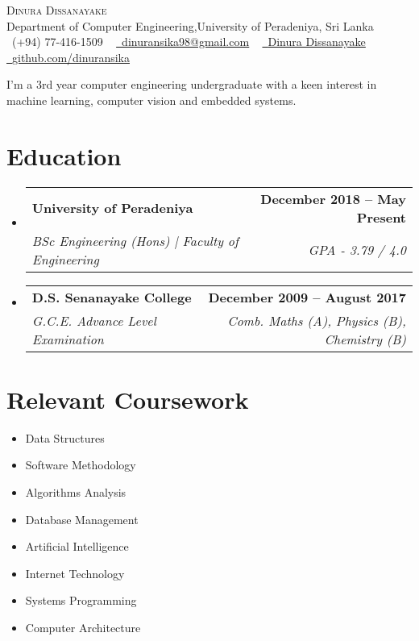 \documentclass[letterpaper,11pt]{article}
\makeatletter
\newcommand{\resumeSubheading}[4]{
  \vspace{-2pt}\item
    \begin{tabular*}{1.0\textwidth}[t]{l@{\extracolsep{\fill}}r}
      \textbf{#1} & \textbf{\small #2} \\
      \textit{\small#3} & \textit{\small #4} \\
    \end{tabular*}\vspace{-7pt}
}
\newcommand{\resumeSubSubheading}[2]{
    \item
    \begin{tabular*}{1\textwidth}{l@{\extracolsep{\fill}}r}
      \textit{\small#1} & \textit{\small #2} \\
    \end{tabular*}\vspace{-7pt}
}
\newcommand{\resumeSubHeadingListStart}{\begin{itemize}[leftmargin=0.0in, label={}]}
\newcommand{\resumeSubHeadingListEnd}{\end{itemize}}
\makeatother
\begin{document}
\begin{center}
    {\Huge \scshape Dinura Dissanayake} \\ \vspace{1pt}
    Department of Computer Engineering,University of Peradeniya, Sri Lanka  \\ \vspace{1pt}
    \small \raisebox{-0.1\height}\faPhone\ (+94) 77-416-1509 ~ \href{mailto:dinuransika98@gmail.com}{\raisebox{-0.2\height}\faEnvelope\  \underline{dinuransika98@gmail.com}} ~ 
    \href{https://www.linkedin.com/in/dinura-dissanayake-9486ba1a1/}{\raisebox{-0.2\height}\faLinkedin\ \underline{Dinura Dissanayake}}  ~
    \href{https://github.com/dinuransika}{\raisebox{-0.2\height}\faGithub\ \underline{github.com/dinuransika}} \\ \vspace{1pt}
    \vspace{-8pt}
\end{center}

\vspace{2pt}
I’m a 3rd year computer engineering undergraduate with a keen interest in machine learning, computer vision and embedded systems.
\vspace{-2pt}
\section{Education}
  \resumeSubHeadingListStart
    \resumeSubheading
      {University of Peradeniya}{December 2018 -- May Present}
      {BSc Engineering (Hons) | Faculty of Engineering }{GPA - 3.79 / 4.0}
      \resumeSubheading
      {D.S. Senanayake College}{December 2009 -- August 2017}
      {G.C.E. Advance Level Examination}{Comb. Maths (A), Physics (B), Chemistry (B)}
  \resumeSubHeadingListEnd

\section{Relevant Coursework}
        \begin{multicols}{4}
            \begin{itemize}[itemsep=-5pt, parsep=6pt]
                \item\small Data Structures
                \item Software Methodology
                \item Algorithms Analysis
                \item Database Management
                \item Artificial Intelligence
                \item Internet Technology
                \item Systems Programming
                \item Computer Architecture
            \end{itemize}
        \end{multicols}
        \vspace*{2.0\multicolsep}
\end{document}
